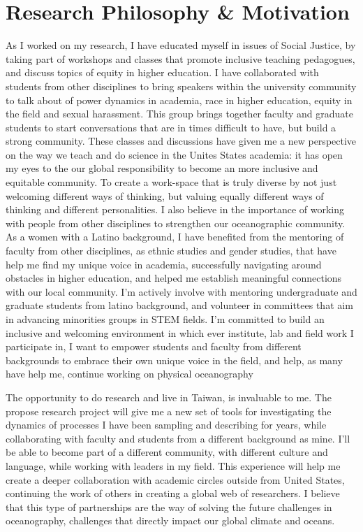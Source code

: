 \documentclass[letterpaper, 12pt ]{article}
\begin{document}
\section*{Research Philosophy \& Motivation}
As I worked on my research, I have educated myself in issues of Social Justice, by taking part of workshops and classes that promote inclusive teaching pedagogues, and discuss topics of equity in higher education. I have collaborated with students from other disciplines to bring speakers within the university community to talk about of power dynamics in academia, race in higher education, equity in the field and sexual harassment. This group brings together faculty and graduate students to start conversations that are in times difficult to have, but build a strong community. These classes and discussions have given me a new perspective on the way we teach and do science in the Unites States academia: it has open my eyes to the our global responsibility to become an more inclusive and equitable community. To create a work-space that is truly diverse by not just welcoming different ways of thinking, but valuing equally different ways of thinking and different personalities. I also believe in the importance of working with people from other disciplines to strengthen our oceanographic community. As a women with a Latino background, I have benefited from the mentoring of faculty from other disciplines, as ethnic studies and gender studies, that have help me find my unique voice in academia,  successfully  navigating around obstacles in higher education, and helped me establish meaningful connections with our local community. I'm actively involve with mentoring undergraduate and graduate students from latino background, and volunteer in committees that aim in advancing minorities groups in STEM fields.  I'm committed to build an inclusive and welcoming environment in which ever institute, lab and field work I participate in, I want to empower students and faculty from different backgrounds to embrace their own unique voice in the field, and help, as many have help me, continue working on physical oceanography

\vspace{10pt}
The opportunity to do research and live in Taiwan, is invaluable to me. The propose research project will give me a new set of tools for investigating the dynamics of processes I have been sampling and describing for years, while collaborating with faculty and students from a different background as mine. I'll be able to become part of a different community, with different culture and language, while working with leaders in my field. This experience will help me create a deeper collaboration with academic circles outside from United States, continuing the work of others in creating a global web of researchers. I believe that this type of partnerships are the way of solving the future challenges in  oceanography, challenges that directly impact our global climate and oceans. 

 
\end{document}
